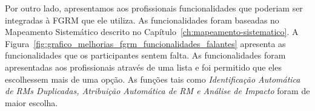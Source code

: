 Por outro lado, apresentamos aos profissionais funcionalidades que poderiam ser
integradas à FGRM que ele utiliza. As funcionalidades foram baseadas no
Mapeamento Sistemático descrito no Capítulo~\ref{ch:mapeamento-sistematico}. A
Figura~\ref{fig:grafico_melhorias_fgrm_funcionalidades_falantes} apresenta as
funcionalidades que os participantes sentem falta. As funcionalidades foram
apresentadas aos profissionais através de uma lista e foi permitido que eles
escolhessem mais de uma opção.  As funções tais como \textit{Identificação
    Automática de RMs Duplicadas, Atribuição Automática de RM e Análise de
    Impacto} foram de maior escolha.



